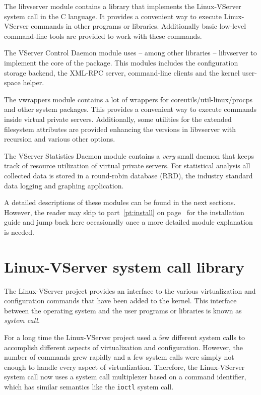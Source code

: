 \begin{labeling}[~~]{}
	 The libvserver module contains a library that implements
		the Linux-VServer system call in the C language. It provides a convenient
		way to execute Linux-VServer commands in other programs or libraries.
		Additionally basic low-level command-line tools are provided to work with
		these commands.

	 The VServer Control Daemon module uses -- among other
		libraries -- libvserver to implement the core of the package. This modules
		includes the configuration storage backend, the XML-RPC server,
		command-line clients and the kernel user-space helper.

	 The vwrappers module contains a lot of wrappers for
		coreutils/util-linux/procps and other system packages. This provides a
		convenient way to execute commands inside virtual private servers.
		Additionally, some utilities for the extended filesystem attributes are
		provided enhancing the versions in libvserver with recursion and various
		other options.

	 The VServer Statistics Daemon module contains a \emph{very}
		small daemon that keeps track of resource utilization of virtual private
		servers. For statistical analysis all collected data is stored in a
		round-robin database (RRD), the industry standard data logging and graphing
		application.
\end{labeling}

A detailed descriptions of these modules can be found in the next sections.
However, the reader may skip to part~\ref{pt:install} on
page~\pageref{pt:install} for the installation guide and jump back here
occasionally once a more detailed module explanation is needed.


\section{Linux-VServer system call library}
\label{sec:intro:vcd:libvserver}

The Linux-VServer project provides an interface to the various virtualization
and configuration commands that have been added to the kernel. This interface
between the operating system and the user programs or libraries is known as
\emph{system call}.

For a long time the Linux-VServer project used a few different system calls to
accomplish different aspects of virtualization and configuration. However, the
number of commands grew rapidly and a few system calls were simply not enough to
handle every aspect of virtualization. Therefore, the Linux-VServer system call
now uses a system call multiplexer based on a command identifier, which has
similar semantics like the \texttt{ioctl} system call.

